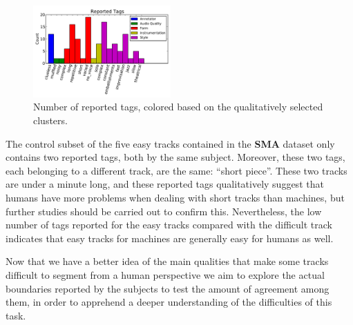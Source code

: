 \documentclass{article}
\begin{document}
\begin{figure}
  \centering
  \includegraphics[width=0.47\textwidth]{plots/reported-tags.pdf}
  \caption{Number of reported tags, colored based on the qualitatively selected clusters.}
  \label{fig:difficult-tags-type}
\end{figure}%

The control subset of the five easy tracks contained in the \textbf{SMA} dataset only contains two reported tags, both by the same subject.
Moreover, these two tags, each belonging to a different track, are the same: ``short piece''.
These two tracks are under a minute long, and these reported tags qualitatively suggest that humans have more problems when dealing with short tracks than machines, but further studies should be carried out to confirm this.
Nevertheless, the low number of tags reported for the easy tracks compared with the difficult track indicates that easy tracks for machines are generally easy for humans as well.

Now that we have a better idea of the main qualities that make some tracks difficult to segment from a human perspective we aim to explore the actual boundaries reported by the subjects to test the amount of agreement among them, in order to apprehend a deeper understanding of the difficulties of this task.

\end{document}
